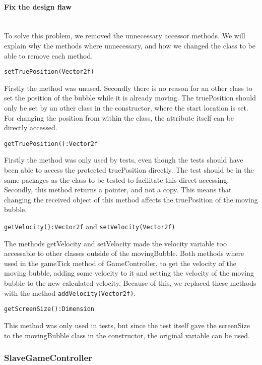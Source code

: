 \documentclass[a4paper]{article}
\begin{document}
\paragraph{Fix the design flaw}\mbox{}\\
To solve this problem, we removed the unnecessary accessor methods. We will explain why the methods where unnecessary, and how we changed the class to be able to remove each method.

\texttt{setTruePosition(Vector2f)}

Firstly the method was unused. Secondly there is no reason for an other class to set the position of the bubble while it is already moving. The truePosition should only be set by an other class in the constructor, where the start location is set. For changing the position from within the class, the attribute itself can be directly accessed.

\texttt{getTruePosition():Vector2f}

Firstly the method was only used by tests, even though the tests should have been able to access the protected truePosition directly. The test should be in the same packages as the class to be tested to facilitate this direct accessing.
Secondly, this method returns a pointer, and not a copy. This means that changing the received object of this method affects the truePosition of the moving bubble.

\texttt{getVelocity():Vector2f} and \texttt{setVelocity(Vector2f)}

The methods getVelocity and setVelocity made the velocity variable too accessable to other classes outside of the movingBubble.
Both methods where used in the gameTick method of GameController, to get the velocity of the moving bubble, adding some velocity to it and setting the velocity of the moving bubble to the new calculated velocity. Because of this, we replaced these methods with the method \texttt{addVelocity(Vector2f)}.

\texttt{getScreenSize():Dimension}

This method was only used in tests, but since the test itself gave the screenSize to the movingBubble class in the constructor, the original variable can be used.


\subsubsection{SlaveGameController}\label{SlaveGameController}
\end{document}
